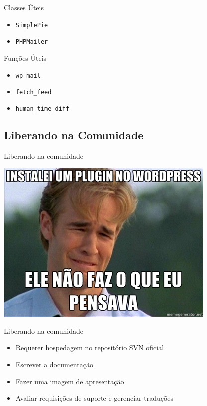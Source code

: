 \documentclass{beamer}
\begin{document}
\begin{frame}{Classes Úteis}
\begin{itemize}
  \pause \item \texttt{SimplePie}
  \pause \item \texttt{PHPMailer}
\end{itemize}
\end{frame}

\begin{frame}{Funções Úteis}
\begin{itemize}
  \pause \item \texttt{wp\_mail}
  \pause \item \texttt{fetch\_feed}
  \pause \item \texttt{human\_time\_diff}
\end{itemize}
\end{frame}

\subsection{Liberando na Comunidade}

\begin{frame}{Liberando na comunidade}
\begin{center}
  \includegraphics[height=0.8\textheight]{./img/plugins-install.jpg}
\end{center}
\end{frame}

\begin{frame}{Liberando na comunidade}
\begin{itemize}
  \pause \item Requerer hospedagem no repositório SVN oficial
  \pause \item Escrever a documentação
  \pause \item Fazer uma imagem de apresentação
  \pause \item Avaliar requisições de suporte e gerenciar traduções
\end{itemize}
\end{frame}
\end{document}
